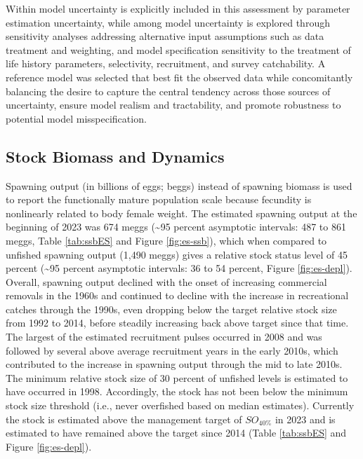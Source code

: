 \documentclass[11pt,
  letterpaper,
]{article}
\begin{document}
Within model uncertainty is explicitly included in this assessment by parameter estimation uncertainty, while among model uncertainty is explored through sensitivity analyses addressing alternative input assumptions such as data treatment and weighting, and model specification sensitivity to the treatment of life history parameters, selectivity, recruitment, and survey catchability. A reference model was selected that best fit the observed data while concomitantly balancing the desire to capture the central tendency across those sources of uncertainty, ensure model realism and tractability, and promote robustness to potential model misspecification.

\hypertarget{stock-biomass-and-dynamics}{%
\subsection*{Stock Biomass and Dynamics}\label{stock-biomass-and-dynamics}}

Spawning output (in billions of eggs; beggs) instead of spawning biomass is used to report the functionally mature population scale because fecundity is nonlinearly related to body female weight. The estimated spawning output at the beginning of 2023 was 674 meggs (\textasciitilde95 percent asymptotic intervals: 487 to 861 meggs, Table \ref{tab:ssbES} and Figure \ref{fig:es-ssb}), which when compared to unfished spawning output (1,490 meggs) gives a relative stock status level of 45 percent (\textasciitilde95 percent asymptotic intervals: 36 to 54 percent, Figure \ref{fig:es-depl}). Overall, spawning output declined with the onset of increasing commercial removals in the 1960s and continued to decline with the increase in recreational catches through the 1990s, even dropping below the target relative stock size from 1992 to 2014, before steadily increasing back above target since that time. The largest of the estimated recruitment pulses occurred in 2008 and was followed by several above average recruitment years in the early 2010s, which contributed to the increase in spawning output through the mid to late 2010s. The minimum relative stock size of 30 percent of unfished levels is estimated to have occurred in 1998. Accordingly, the stock has not been below the minimum stock size threshold (i.e., never overfished based on median estimates). Currently the stock is estimated above the management target of \(SO_{40\%}\) in 2023 and is estimated to have remained above the target since 2014 (Table \ref{tab:ssbES} and Figure \ref{fig:es-depl}).
\end{document}
